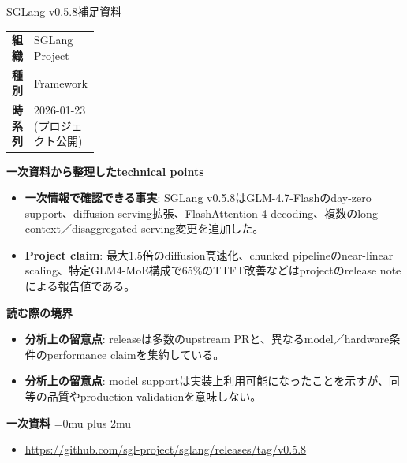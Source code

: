 \begin{technicalnote}{SGLang v0.5.8}{補足資料}
\begingroup
\begin{tabularx}{\linewidth}{@{}>{\bfseries}p{0.22\linewidth}X@{}}
組織 & SGLang Project \\
種別 & Framework \\
時系列 & 2026-01-23 (プロジェクト公開) \\
\end{tabularx}
\smallskip
{\bfseries 一次資料から整理したtechnical points}
\begin{itemize}[leftmargin=1.5em,itemsep=0.35em]
\item \textbf{一次情報で確認できる事実}: SGLang v0.5.8はGLM-4.7-Flashのday-zero support、diffusion serving拡張、FlashAttention 4 decoding、複数のlong-context／disaggregated-serving変更を追加した。
\item \textbf{Project claim}: 最大1.5倍のdiffusion高速化、chunked pipelineのnear-linear scaling、特定GLM4-MoE構成で65\%のTTFT改善などはprojectのrelease noteによる報告値である。
\end{itemize}
\begin{minipage}{\linewidth}
{\bfseries 読む際の境界}
\begin{itemize}[leftmargin=1.5em,itemsep=0.35em]
\item \textbf{分析上の留意点}: releaseは多数のupstream PRと、異なるmodel／hardware条件のperformance claimを集約している。
\item \textbf{分析上の留意点}: model supportは実装上利用可能になったことを示すが、同等の品質やproduction validationを意味しない。
\end{itemize}
\begin{samepage}
{\bfseries 一次資料}
\begingroup\sloppy
\Urlmuskip=0mu plus 2mu\relax
\begin{itemize}[leftmargin=1.5em,itemsep=0.25em]
\item {\scriptsize\url{https://github.com/sgl-project/sglang/releases/tag/v0.5.8}}
\end{itemize}
\endgroup
\end{samepage}
\end{minipage}
\endgroup
\end{technicalnote}
\medskip
